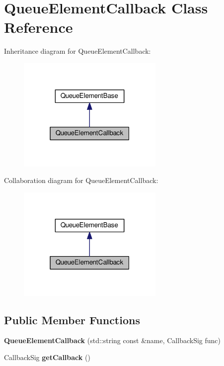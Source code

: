 \hypertarget{classQueueElementCallback}{}\section{Queue\+Element\+Callback Class Reference}
\label{classQueueElementCallback}


Inheritance diagram for Queue\+Element\+Callback\+:\nopagebreak
\begin{figure}[H]
\begin{center}
\leavevmode
\includegraphics[width=199pt]{classQueueElementCallback__inherit__graph}
\end{center}
\end{figure}


Collaboration diagram for Queue\+Element\+Callback\+:\nopagebreak
\begin{figure}[H]
\begin{center}
\leavevmode
\includegraphics[width=199pt]{classQueueElementCallback__coll__graph}
\end{center}
\end{figure}
\subsection*{Public Member Functions}
\begin{DoxyCompactItemize}
\item 
{\bfseries Queue\+Element\+Callback} (std\+::string const \&name, Callback\+Sig func)\hypertarget{classQueueElementCallback_ac8dfce454a7807e007a00235db8f24ec}{}\label{classQueueElementCallback_ac8dfce454a7807e007a00235db8f24ec}

\item 
Callback\+Sig {\bfseries get\+Callback} ()\hypertarget{classQueueElementCallback_a4b48898ed348624818f064f7dbd75a73}{}\label{classQueueElementCallback_a4b48898ed348624818f064f7dbd75a73}

\end{DoxyCompactItemize}
